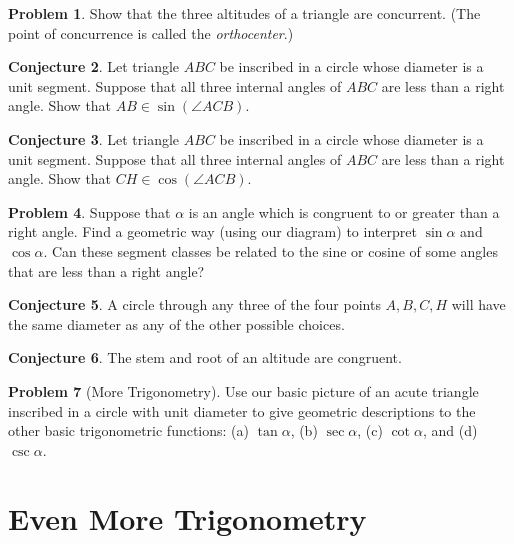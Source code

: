 \documentclass{amsart}
\theoremstyle{definition}
\newtheorem{problem}{Problem}[section]
\newtheorem{conjecture}[problem]{Conjecture}
\begin{document}
\begin{problem} \label{prob:orthocenter}
Show that the three altitudes of a triangle are concurrent. (The point of concurrence is called the \emph{orthocenter}.)
\end{problem}

\begin{conjecture} \label{prob:sine-in-circle}
Let triangle $ABC$ be inscribed in a circle whose diameter is a unit segment. Suppose that all three internal angles of $ABC$ are less than a right angle. Show that $AB \in \sin(\angle ACB)$.
\end{conjecture}

\begin{conjecture} \label{prob:cosine-in-circle}
Let triangle $ABC$ be inscribed in a circle whose diameter is a unit segment. Suppose that all three internal angles of $ABC$ are less than a right angle. Show that $CH \in \cos(\angle ACB)$.
\end{conjecture}



\begin{problem} Suppose that $\alpha$ is an angle which is congruent to or greater than a right angle. Find a geometric way (using our diagram) to interpret $\sin\alpha$ and $\cos\alpha$. Can these segment classes be related to the sine or cosine of some angles that are less than a right angle?
\end{problem}

\begin{conjecture}
A circle through any three of the four points $A, B, C, H$ will have the same diameter as any of the other possible choices.
\end{conjecture}

\begin{conjecture}
The stem and root of an altitude are congruent.
\end{conjecture}

\begin{problem}[More Trigonometry]\label{prob:trig-fns-cont}
Use our basic picture of an acute triangle inscribed in a circle with unit diameter to give geometric descriptions to the other basic trigonometric functions: (a) $\tan \alpha$, (b) $\sec \alpha$, (c) $\cot \alpha$, and (d) $\csc \alpha$.
\end{problem}

\vfill
\pagebreak

\section{Even More Trigonometry}
\end{document}
